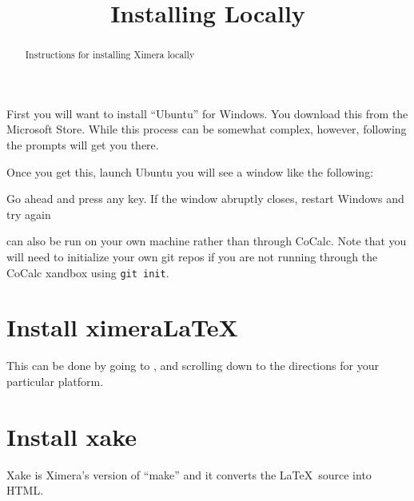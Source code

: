 \documentclass{ximera}
\title{Installing Locally}
\begin{document}
\begin{abstract}
Instructions for installing Ximera locally
\end{abstract}
\maketitle

First you will want to install ``Ubuntu'' for Windows. You download
this from the Microsoft Store. While this process can be somewhat
complex, however, following the prompts will get you there.

Once  you get this, launch Ubuntu you will see a window like the following:


Go ahead and press any key. If the window abruptly closes, restart
Windows and try again


 can also be run on your own machine rather than through CoCalc. Note that you will need to initialize your own git repos if you are not running through the CoCalc xandbox using \verb!git init!.

\section{Install ximeraLaTeX}

This can be done by going to , and scrolling
down to the directions for your particular platform.




\section{Install xake}

Xake is Ximera's version of ``make'' and it converts the
\LaTeX\ source into HTML.
\end{document}
